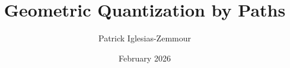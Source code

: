 \documentclass[10pt,reqno,letterpaper,twoside]{amsbook}
\title{Geometric Quantization by Paths}
\author{Patrick Iglesias-Zemmour}
\date{February 2026}
\begin{document}
  
  
  
  \maketitle
  
  
  \renewcommand \thechapter{\Roman{chapter}}
  \renewcommand \thesection{\Roman{section}}
  
  
  
  \renewcommand{\Komega}{\CHO\!\omega}
  \!
  \renewcommand{\Kalpha}{\CHO\!\alpha}
  
  \renewcommand{\Kbeta}{\CHO\!\beta}
  
  \renewcommand{\KVol}{\CHO\!\Vol}
  
\end{document}
